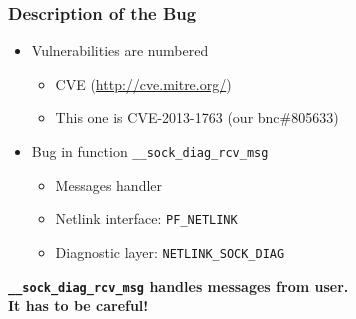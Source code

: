 \documentclass[xcolor=dvipsnames]{beamer}
\newcommand{\heading}[1]{\textbf{\textcolor{BurntOrange}{#1}}}
\newcommand{\code}[2][]{\lstinline[columns=fullflexible, basicstyle=\ttfamily,
	#1]$#2$}
\begin{document}
\begin{frame}
  \frametitle{Description of the Bug}

  \begin{itemize}
    \item Vulnerabilities are numbered
    \begin{itemize}
      \item CVE (\url{http://cve.mitre.org/})
      \item This one is CVE-2013-1763 (our bnc\#805633)
    \end{itemize}

    \pause
    \medskip

    \item Bug in function \code{__sock_diag_rcv_msg}
    \begin{itemize}
      \item Messages handler
      \item Netlink interface: \code{PF_NETLINK}
      \item Diagnostic layer: \code{NETLINK_SOCK_DIAG}

    \end{itemize}

  \end{itemize}

  \bigskip
  \pause

  \begin{center}
    \heading{\code{__sock_diag_rcv_msg} handles messages from user. \\ It has
    to be careful!}
  \end{center}

\end{frame}
\end{document}
